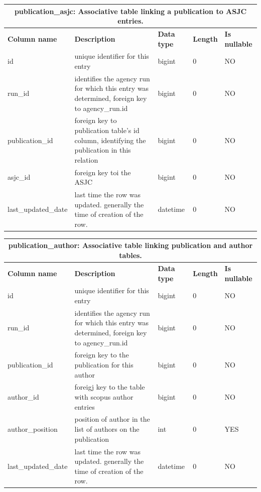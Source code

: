 \documentclass[titlepage, 11pt]{article}
\begin{document}
{\begin{table}[h!]
{\renewcommand{\arraystretch}{1.5}%
\begin{tabularx}{1\textwidth} {|p{4cm}|p{5.33cm}|p{2cm}|p{1.5cm}|p{1.5cm}|}
 \hline
 \multicolumn{5}{|c|}{\textbf{publication\_asjc: Associative table linking a publication to ASJC entries.}}\\
 \hline
 \textbf{Column name} & \textbf{Description} & \textbf{Data type} & \textbf{Length} & \textbf{Is nullable} \\
 \hline
 id & unique identifier for this entry & bigint & 0 & NO \\
 \hline
 run\_id & identifies the agency run for which this entry was determined, foreign key to agency\_run.id & bigint   & 0 & NO \\
 \hline
 publication\_id     & foreign key to publication table's id column, identifying the publication in this relation   & bigint   & 0 & NO \\
\hline
 asjc\_id & foreign key toi the ASJC   & bigint & 0 & NO \\
 \hline
last\_updated\_date & last time the row was updated. generally the time of creation of the row. & datetime & 0 & NO \\
\hline

\end{tabularx}
\label{table: appendix b - publication asjc}
}
\end{table}

\begin{table}[h!]

{\renewcommand{\arraystretch}{1.5}%
\begin{tabularx}{1\textwidth} {|p{4cm}|p{5.33cm}|p{2cm}|p{1.5cm}|p{1.5cm}|}
 \hline
 \multicolumn{5}{|c|}{\textbf{publication\_author: Associative table linking publication and author tables.}}\\
 \hline
 \textbf{Column name} & \textbf{Description} & \textbf{Data type} & \textbf{Length} & \textbf{Is nullable} \\
 \hline
 id & unique identifier for this entry & bigint & 0 & NO \\
 \hline
 run\_id & identifies the agency run for which this entry was determined, foreign key to agency\_run.id & bigint   & 0 & NO  \\
 \hline
 publication\_id & foreign key to the publication for this author & bigint & 0 & NO \\
 \hline
 author\_id & foreigj key to the table with scopus author entries & bigint & 0 & NO \\
 \hline
 author\_position  & position of author in the list of authors on the publication  & int & 0 & YES \\
 \hline
last\_updated\_date & last time the row was updated. generally the time of creation of the row. & datetime & 0 & NO \\
\hline


\end{tabularx}}
\end{table}}
\end{document}
